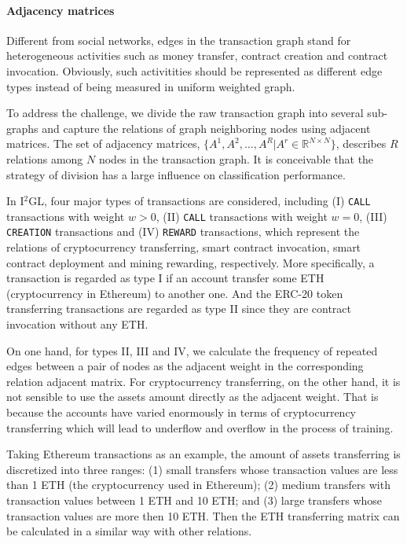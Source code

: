 \paragraph{Adjacency matrices} Different from social networks, edges in the transaction graph stand for heterogeneous activities such as money transfer, contract creation and contract invocation. Obviously, such %
activitities should be represented as different edge types instead of being measured in uniform weighted graph.

To address the challenge, we divide the raw transaction graph into several sub-graphs and capture the relations of graph neighboring nodes using adjacent matrices. The set of adjacency matrices, $\{A^1,A^2,\dots,A^R|A^r\in \mathbb{R}^{N \times N}\}$, describes $R$ relations among $N$ nodes in the transaction graph. It is conceivable that the strategy of division has a large influence on classification performance.

In I$^2$GL, four major types of transactions are considered, including (I) \texttt{CALL} transactions with weight $w>0$, (II) \texttt{CALL} transactions with weight $w=0$, (III) \texttt{CREATION} transactions and (IV) \texttt{REWARD} transactions, which represent the relations of cryptocurrency transferring, smart contract invocation, smart contract deployment and mining rewarding, respectively. More specifically, a transaction is regarded as type I if an account transfer some ETH (cryptocurrency in Ethereum) to another one. And the ERC-20 token transferring transactions are regarded as type II since they are contract invocation without any ETH.

On one hand, for types II, III and IV, we calculate the frequency of repeated edges between a pair of nodes as the adjacent weight in the corresponding relation adjacent matrix. For cryptocurrency transferring, on the other hand, it is not sensible to use the assets amount directly as the adjacent weight. That is because the accounts have varied enormously in terms of cryptocurrency transferring which will lead to underflow and overflow in the process of training.

 Taking Ethereum transactions as an example, the amount of assets transferring is discretized into three ranges: (1) small transfers whose transaction values are less than 1 ETH (the cryptocurrency used in Ethereum); (2) medium transfers with transaction values between 1 ETH and 10 ETH; and (3) large transfers whose transaction values are more then 10 ETH. Then the ETH transferring matrix can be calculated in a similar way with other relations.

